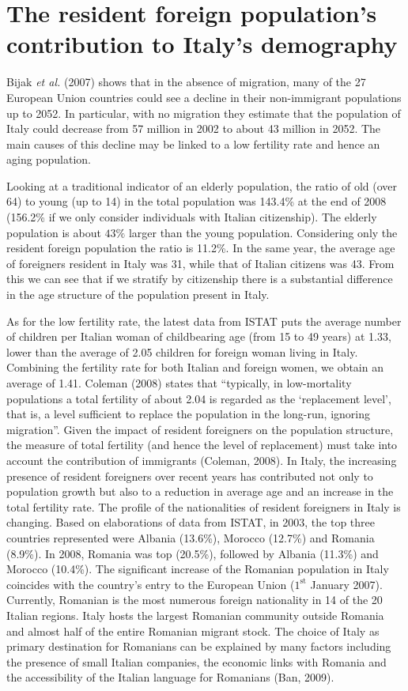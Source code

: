 \section{The resident foreign population's contribution to Italy's demography \label{DEM}}

Bijak \textit{et al.} (2007) shows that in the absence of migration, many of the 27 European Union countries could see a decline in their non-immigrant populations up to 2052. In particular, with no migration they estimate that the population of Italy could decrease from 57 million in 2002 to about 43 million in 2052. The main causes of this decline may be linked to a low fertility rate and hence an aging population. 

Looking at a traditional indicator of an elderly population, the ratio of old (over 64) to young (up to 14) in the total population was 143.4\% at the end of 2008 (156.2\% if we only consider individuals with Italian citizenship). The elderly population is about $43\%$ larger than the young population. Considering only the resident foreign population the ratio is 11.2\%. In the same year, the average age of foreigners resident in Italy was 31, while that of Italian citizens was 43. From this we can see that if we stratify by citizenship there is a substantial difference in the age structure of the population present in Italy.

As for the low fertility rate, the latest data from ISTAT puts the average number of children per Italian woman of childbearing age (from 15 to 49 years) at 1.33, lower than the average of 2.05 children for foreign woman living in Italy. Combining the fertility rate for both Italian and foreign women, we obtain an average of 1.41. Coleman (2008) states that ``typically, in low-mortality populations a total fertility of about 2.04 is regarded as the `replacement level', that is, a level sufficient to replace the population in the long-run, ignoring migration''. Given the impact of resident foreigners on the population structure, the measure of total fertility (and hence the level of replacement) must take into account the contribution of immigrants (Coleman, 2008). In Italy, the increasing presence of resident foreigners over recent years has contributed not only to population growth but also to a reduction in average age and an increase in the total fertility rate. The profile of the nationalities of resident foreigners in Italy is changing. Based on elaborations of data from ISTAT, in 2003, the top three countries represented were Albania (13.6\%), Morocco (12.7\%) and Romania (8.9\%). In 2008, Romania was top (20.5\%), followed by Albania (11.3\%) and Morocco (10.4\%). The significant increase of the Romanian population in Italy coincides with the country's entry to the European Union ($1^\text{st}$ January 2007). Currently, Romanian is the most numerous foreign nationality in 14 of the 20 Italian regions. Italy hosts the largest Romanian community outside Romania and almost half of the entire Romanian migrant stock. The choice of Italy as primary destination for Romanians can be explained by many factors including the presence of small Italian companies, the economic links with Romania and the accessibility of the Italian language for Romanians (Ban, 2009). 

